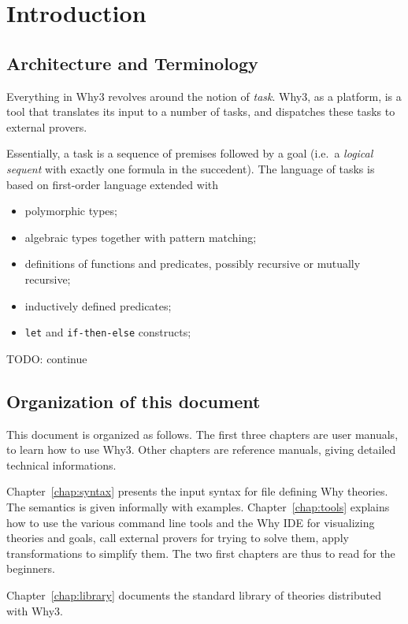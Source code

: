 
\chapter{Introduction}

\section{Architecture and Terminology}

Everything in Why3 revolves around the notion of
\emph{task}.  Why3, as a platform, is a tool that
translates its input to a number of tasks, and dispatches these tasks
to external provers. 

Essentially, a task is a sequence of premises followed by a goal
(i.e.~a \emph{logical sequent} with exactly one formula in the
succedent). The language of tasks is based on first-order language
extended with 
\begin{itemize}
\item polymorphic types;
\item algebraic types together with pattern matching;
\item definitions of functions and predicates, possibly recursive or
  mutually recursive;
\item inductively defined predicates;
\item \texttt{let} and \texttt{if-then-else} constructs;
\end{itemize}

TODO: continue

\section{Organization of this document}

This document is organized as follows. The first three chapters are
user manuals, to learn how to use Why3. Other chapters are reference
manuals, giving detailed technical informations.

Chapter~\ref{chap:syntax} presents the input syntax for file defining
Why theories. The semantics is given informally with examples.
Chapter~\ref{chap:tools} explains how to use the various command line
tools and the Why IDE for visualizing theories and goals, call
external provers for trying to solve them, apply transformations to
simplify them. The two first chapters are thus to read for the
beginners.

Chapter~\ref{chap:library} documents the standard library of theories
distributed with Why3. 

